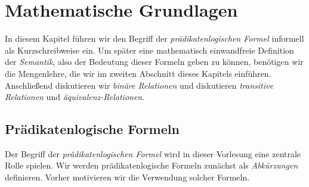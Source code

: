 \chapter{Mathematische Grundlagen} 
In diesem Kapitel f\"{u}hren wir den Begriff der \emph{pr\"{a}dikatenlogischen Formel} informell
als Kurzschreibweise ein.  Um sp\"{a}ter eine mathematisch einwandfreie Definition der
\emph{Semantik}, also der Bedeutung dieser Formeln geben zu k\"{o}nnen, ben\"{o}tigen wir die
Mengenlehre, die wir im zweiten Abschnitt dieses Kapitels einf\"{u}hren.  Anschließend
diskutieren wir \emph{bin\"{a}re Relationen} und diskutieren 
\emph{transitive Relationen} und \emph{\"{a}quivalenz-Relationen}.


\section{Pr\"{a}dikatenlogische Formeln}
Der Begriff der \emph{pr\"{a}dikatenlogischen Formel} wird in dieser Vorlesung eine zentrale
Rolle spielen.  Wir werden pr\"{a}dikatenlogische Formeln zun\"{a}chst als \emph{Abk\"{u}rzungen} definieren.  
Vorher motivieren wir die Verwendung solcher Formeln.

